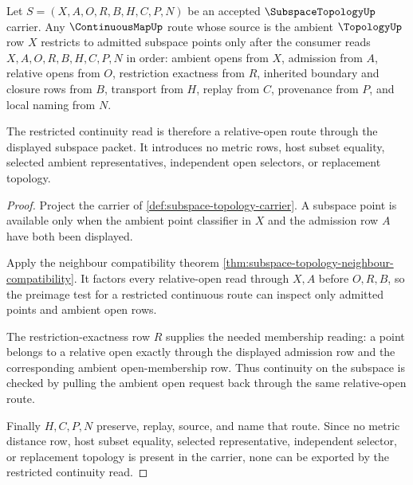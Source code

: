 \begin{theorem}
\label{thm:subspace-topology-continuity-restriction}
Let $S=(X,A,O,R,B,H,C,P,N)$ be an accepted $\SubspaceTopologyUp$ carrier. Any $\ContinuousMapUp$ route whose source is the ambient $\TopologyUp$ row $X$ restricts to admitted subspace points only after the consumer reads $X,A,O,R,B,H,C,P,N$ in order: ambient opens from $X$, admission from $A$, relative opens from $O$, restriction exactness from $R$, inherited boundary and closure rows from $B$, transport from $H$, replay from $C$, provenance from $P$, and local naming from $N$.

The restricted continuity read is therefore a relative-open route through the displayed subspace packet. It introduces no metric rows, host subset equality, selected ambient representatives, independent open selectors, or replacement topology.
\end{theorem}
\begin{proof}
Project the carrier of \autoref{def:subspace-topology-carrier}. A subspace point is available only when the ambient point classifier in $X$ and the admission row $A$ have both been displayed.

Apply the neighbour compatibility theorem \autoref{thm:subspace-topology-neighbour-compatibility}. It factors every relative-open read through $X,A$ before $O,R,B$, so the preimage test for a restricted continuous route can inspect only admitted points and ambient open rows.

The restriction-exactness row $R$ supplies the needed membership reading: a point belongs to a relative open exactly through the displayed admission row and the corresponding ambient open-membership row. Thus continuity on the subspace is checked by pulling the ambient open request back through the same relative-open route.

Finally $H,C,P,N$ preserve, replay, source, and name that route. Since no metric distance row, host subset equality, selected representative, independent selector, or replacement topology is present in the carrier, none can be exported by the restricted continuity read.
\end{proof}

